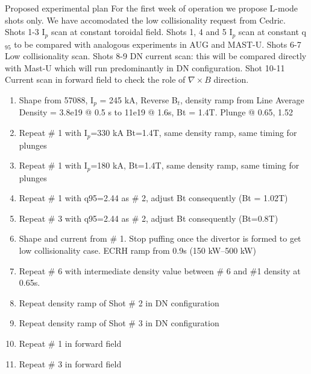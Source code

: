 \documentclass[10pt, compress]{beamer}
\newcommand\Fontvi{\fontsize{8}{7.2}\selectfont}
\begin{document}
  \begin{frame}{Proposed experimental plan}
\Fontvi
    \alert{For the first week of operation we propose L-mode shots
      only. We have accomodated the low collisionality request from
      Cedric. Shots 1-3 I$_p$ scan at constant toroidal field. Shots
      1, 4 and 5 I$_p$ scan at constant q$_{95}$ to be compared with
      analogous experiments in AUG and MAST-U. Shots 6-7 Low
      collisionality scan. Shots 8-9 DN current scan: this will be
      compared directly with Mast-U which will run predominantly in DN
    configuration. Shot 10-11 Current scan in forward field to check
    the role of $\nabla\times B$ direction.}
\begin{enumerate}
\item Shape from 57088, I$_p$ = 245 kA,  Reverse B$_t$,
    density ramp from Line Average Density = 3.8e19 @ 0.5 s to 11e19 @ 1.6s,  Bt = 1.4T. Plunge @ 0.65, 1.52
\item  Repeat \# 1 with I$_p$=330 kA Bt=1.4T, same density ramp, same timing for plunges
\item  Repeat \# 1 with I$_p$=180 kA, Bt=1.4T, same density ramp, same timing for plunges
\item  Repeat \# 1 with q95=2.44 as \# 2, adjust Bt consequently (Bt = 1.02T)
\item  Repeat \# 3 with q95=2.44 as \# 2, adjust Bt consequently (Bt=0.8T)
\item  Shape and current from \# 1. Stop puffing once the divertor is
  formed to get low collisionality case. ECRH ramp from 0.9s (150
  kW--500 kW)
\item  Repeat \# 6 with intermediate density value between \# 6 and
  \#1 density at 0.65s. 
\item  Repeat density ramp of Shot \# 2 in DN configuration 
\item  Repeat density ramp of Shot \# 3 in DN configuration 
\item Repeat \# 1 in forward field
\item Repeat \# 3 in forward field
\end{enumerate}
\end{frame}
\end{document}
